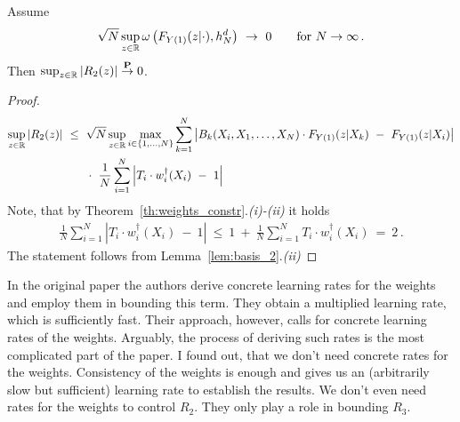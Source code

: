 \begin{lemma}
  Assume
  \begin{align*}
    \sqrt{N}
    \sup_{z\in\R}
    \omega
    \left( 
      F_{Y(1)}(z|\cdot)
      ,h_N^d
    \right)
    \ 
    \to 
    \ 
    0
    \qquad
    \text{for}\ 
    N\to\infty
    \,.
  \end{align*}
  Then $\sup_{z\in\mathbb{R}}|R_2(z)|\overset{\mathbf{P}}{\to} 0$.
\end{lemma}
\begin{proof}
  \begin{align*}
    \sup_{z\in\R}
    \left| R_2(z) \right|
    &
    \  
    \le
    \  
        \sqrt{N}
        \sup_{z\in\R}
        \max_{i\in \left\{ 1,\ldots,N \right\}}
        \sum_{k=1}^{N}
            \left|
        B_k(X_i,X_1,\ldots,X_N)
        \cdot
        F_{Y(1)}(z|X_k)
            \ 
            -
            \ 
        F_{Y(1)}(z|X_i)
            \right|
            \\
            &
            \qquad
            \cdot
            \ 
    \frac{1}{N}
    \sum_{i=1}^{N} 
      \left| 
    T_i\cdot w^\dagger_i(X_i) 
    \ 
    -
    \ 
    1 
      \right|
  \end{align*}
  Note, that by Theorem~\ref{th:weights_constr}.\textit{(i)-(ii)}
  it holds
  \begin{align*}
    \frac{1}{N}
    \sum_{i=1}^{N} 
      \left| 
    T_i\cdot w^\dagger_i(X_i) 
    \ 
    -
    \ 
    1 
      \right|
      \ 
    \le
      \ 
    1
    \ 
    +
    \ 
    \frac{1}{N}
    \sum_{i=1}^{N} 
    T_i\cdot w^\dagger_i(X_i) 
    \ 
    =
    \ 
    2
    \,.
  \end{align*}
  The statement follows from Lemma~\ref{lem:basis_2}.\textit{(ii)}
\end{proof}
\begin{remark}
In the original paper \cite{Wang2019} the authors derive concrete learning rates for the weights and employ them in bounding this term. They obtain a multiplied learning rate, which is sufficiently fast. Their approach, however, calls for concrete learning rates of the weights. Arguably, the process of deriving such rates is the most complicated part of the paper. 
I found out, that we don't need concrete rates for the weights. 
Consistency of the weights is enough and gives us an (arbitrarily slow but sufficient) learning rate to establish the results.
We don't even need rates for the weights to control $R_2$.
They only play a role in bounding $R_3$. 
\end{remark}


